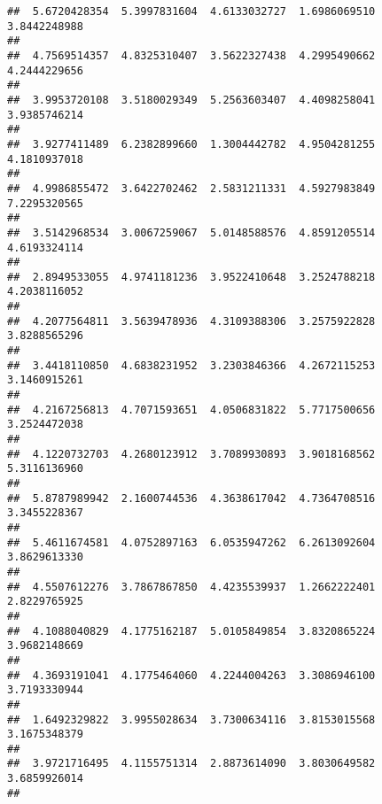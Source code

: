 \documentclass[]{article}
\begin{document}
\begin{verbatim}
##  5.6720428354  5.3997831604  4.6133032727  1.6986069510  3.8442248988 
##                                                                       
##  4.7569514357  4.8325310407  3.5622327438  4.2995490662  4.2444229656 
##                                                                       
##  3.9953720108  3.5180029349  5.2563603407  4.4098258041  3.9385746214 
##                                                                       
##  3.9277411489  6.2382899660  1.3004442782  4.9504281255  4.1810937018 
##                                                                       
##  4.9986855472  3.6422702462  2.5831211331  4.5927983849  7.2295320565 
##                                                                       
##  3.5142968534  3.0067259067  5.0148588576  4.8591205514  4.6193324114 
##                                                                       
##  2.8949533055  4.9741181236  3.9522410648  3.2524788218  4.2038116052 
##                                                                       
##  4.2077564811  3.5639478936  4.3109388306  3.2575922828  3.8288565296 
##                                                                       
##  3.4418110850  4.6838231952  3.2303846366  4.2672115253  3.1460915261 
##                                                                       
##  4.2167256813  4.7071593651  4.0506831822  5.7717500656  3.2524472038 
##                                                                       
##  4.1220732703  4.2680123912  3.7089930893  3.9018168562  5.3116136960 
##                                                                       
##  5.8787989942  2.1600744536  4.3638617042  4.7364708516  3.3455228367 
##                                                                       
##  5.4611674581  4.0752897163  6.0535947262  6.2613092604  3.8629613330 
##                                                                       
##  4.5507612276  3.7867867850  4.4235539937  1.2662222401  2.8229765925 
##                                                                       
##  4.1088040829  4.1775162187  5.0105849854  3.8320865224  3.9682148669 
##                                                                       
##  4.3693191041  4.1775464060  4.2244004263  3.3086946100  3.7193330944 
##                                                                       
##  1.6492329822  3.9955028634  3.7300634116  3.8153015568  3.1675348379 
##                                                                       
##  3.9721716495  4.1155751314  2.8873614090  3.8030649582  3.6859926014 
##                                                                       

\end{verbatim}
\end{document}
